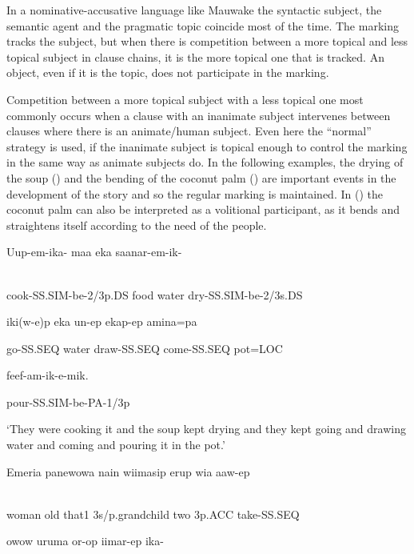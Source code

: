 In a nominative-accusative language like Mauwake the syntactic subject, the semantic agent and the pragmatic topic coincide most of the time. The  marking tracks the subject, but when there is competition between a more topical and less topical subject in clause chains, it is the more topical one that is tracked. An object, even if it is the topic, does not participate in the  marking.

Competition between a more topical subject with a less topical one most commonly occurs when a clause with an inanimate subject intervenes between clauses where there is an animate/human subject. Even here the ``normal''  strategy is used, if the inanimate subject is topical enough to control the  marking in the same way as animate subjects do. In the following examples, the drying of the soup () and the bending of the coconut palm () are important events in the development of the story and so the regular  marking is maintained. In () the coconut palm can also be interpreted as a volitional participant, as it bends and straightens itself according to the need of the people.

\ea%
\label{ex:x1474}
\gll Uup-em-ika- maa  eka  saanar-em-ik- \\
      \\
\glt
\z

cook-SS.SIM-be-2/3p.DS  food  water  dry-SS.SIM-be-2/3s.DS

iki(w-e)p  eka  un-ep  ekap-ep  amina=pa

go-SS.SEQ  water  draw-SS.SEQ  come-SS.SEQ  pot=LOC

feef-am-ik-e-mik.

pour-SS.SIM-be-PA-1/3p

`They were cooking it and the soup kept drying and they kept going and drawing water and coming and pouring it in the pot.'

\ea%
\label{ex:x1480}
\gll Emeria  panewowa  nain  wiimasip  erup  wia  aaw-ep \\
      \\
\glt
\z

woman  old  that1  3s/p.grandchild  two  3p.ACC  take-SS.SEQ

owow  uruma  or-op  iimar-ep  ika-

